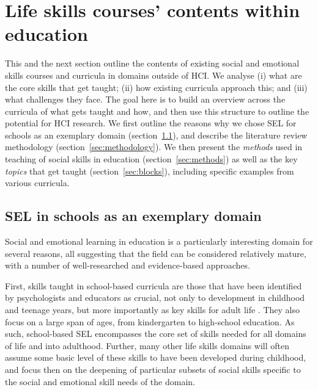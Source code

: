 \documentclass[prodmode,acmtochi]{acmsmall}
\newcommand{\rephrase}[1]{\textrm{\textrm{\textcolor{gray}{#1}}}}
\begin{document}
\section{Life skills courses' contents within education}
\label{sec:SEL}

        This and the next section outline the contents of existing social and emotional skills courses and curricula in domains outside of HCI. We analyse (i) what are the core skills that get taught; (ii) how  existing curricula approach this; and (iii) what challenges they face.    The goal here is to build an overview across the curricula of what gets taught and how, and then use this structure to outline the potential for HCI research. 
%
        We first outline the reasons why we chose SEL for schools as an exemplary domain (section~\ref{sec:reasons}), and describe the literature review methodology (section~\ref{sec:methodology}).
        We then present the \emph{methods} used in teaching of social skills in education (section~\ref{sec:methods})  as well as the key \emph{topics} that  get taught (section~\ref{sec:blocks}), including specific examples from various curricula. 


\subsection{SEL in schools as an exemplary domain}
\label{sec:reasons}
Social and emotional learning in education is a particularly interesting domain for several reasons, all suggesting that the field can be considered relatively mature, with a number of well-researched and evidence-based approaches. 

First, skills taught in school-based curricula are those that have been identified by psychologists and educators as crucial, not only to development in childhood and teenage years, but more importantly as key skills for adult life \cite{Greenberg2010}. They also focus on a large span of ages, from kindergarten to high-school education. As such, school-based SEL encompasses the core set of skills needed for all domains of life and into adulthood. Further, many other life skills domains will often assume some basic level of these skills to have been developed during childhood, and focus then on the deepening of particular subsets of social skills specific to the social and emotional skill needs of the domain.  %
\end{document}
